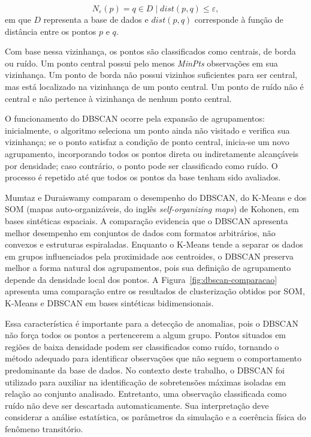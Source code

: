 \documentclass[
	12pt,				%
	openright,			%
	oneside,			%
	a4paper,			%
	chapter=TITLE,		%
	section=TITLE,		%
	subsection=TITLE,	%
	subsubsection=TITLE,%
	english,			%
	brazilian			%
	]{abntex2}
\theoremstyle{definition}
\begin{document}
\begin{equation}
\label{eq:vizinhanca-dbscan}
N_{\varepsilon}(p)={q \in D \mid dist(p,q)\leq \varepsilon},
\end{equation}
em que $D$ representa a base de dados e $dist(p,q)$ corresponde à função de distância entre os pontos $p$ e $q$.

Com base nessa vizinhança, os pontos são classificados como centrais, de borda ou ruído. Um ponto central possui pelo menos \textit{MinPts} observações em sua vizinhança. Um ponto de borda não possui vizinhos suficientes para ser central, mas está localizado na vizinhança de um ponto central. Um ponto de ruído não é central e não pertence à vizinhança de nenhum ponto central.

O funcionamento do DBSCAN ocorre pela expansão de agrupamentos: inicialmente, o algoritmo seleciona um ponto ainda não visitado e verifica sua vizinhança; se o ponto satisfaz a condição de ponto central, inicia-se um novo agrupamento, incorporando todos os pontos direta ou indiretamente alcançáveis por densidade; caso contrário, o ponto pode ser classificado como ruído. O processo é repetido até que todos os pontos da base tenham sido avaliados.

Mumtaz e Duraiswamy \cite{mumtaz2010} comparam o desempenho do DBSCAN, do K-Means e dos SOM (mapas auto-organizáveis, do inglês \textit{self-organizing maps}) de Kohonen, em bases sintéticas espaciais. A comparação evidencia que o DBSCAN apresenta melhor desempenho em conjuntos de dados com formatos arbitrários, não convexos e estruturas espiraladas. Enquanto o K-Means tende a separar os dados em grupos influenciados pela proximidade aos centroides, o DBSCAN preserva melhor a forma natural dos agrupamentos, pois sua definição de agrupamento depende da densidade local dos pontos. A Figura~\ref{fig:dbscan-comparacao} apresenta uma comparação entre os resultados de clusterização obtidos por SOM, K-Means e DBSCAN em bases sintéticas bidimensionais.

Essa característica é importante para a detecção de anomalias, pois o DBSCAN não força todos os pontos a pertencerem a algum grupo. Pontos situados em regiões de baixa densidade podem ser classificados como ruído, tornando o método adequado para identificar observações que não seguem o comportamento predominante da base de dados. No contexto deste trabalho, o DBSCAN foi utilizado para auxiliar na identificação de sobretensões máximas isoladas em relação ao conjunto analisado. Entretanto, uma observação classificada como ruído não deve ser descartada automaticamente. Sua interpretação deve considerar a análise estatística, os parâmetros da simulação e a coerência física do fenômeno transitório.
\end{document}
